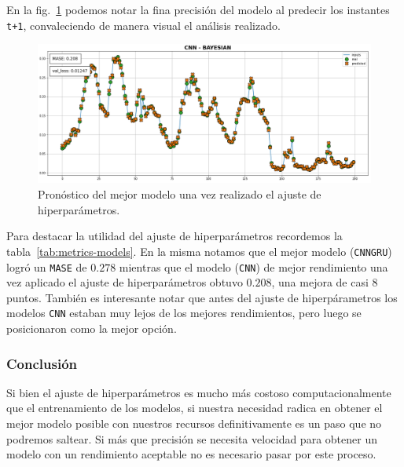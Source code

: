 \documentclass[a4paper,12pt]{article}
\begin{document}
En la fig.~\ref{fig:best_model_hp} podemos notar la fina precisión del modelo al predecir los instantes \texttt{t+1}, convaleciendo de manera visual el análisis realizado.

\begin{figure}[H]
	\begin{center}
	\includegraphics[width=1\textwidth]{cnn_bo_best.png}
  	\caption{Pronóstico del mejor modelo una vez realizado el ajuste de hiperparámetros.}
  	\label{fig:best_model_hp}
  	\end{center}
\end{figure}

Para destacar la utilidad del ajuste de hiperparámetros recordemos la tabla~\ref{tab:metrics-models}. En la misma notamos que el mejor modelo (\texttt{CNNGRU}) logró un \texttt{MASE} de $0.278$ mientras que el modelo (\texttt{CNN}) de mejor rendimiento una vez aplicado el ajuste de hiperparámetros obtuvo $0.208$, una mejora de casi 8 puntos. También es interesante notar que antes del ajuste de hiperpárametros los modelos \texttt{CNN} estaban muy lejos de los mejores rendimientos, pero luego se posicionaron como la mejor opción.

\subsubsection{Conclusión}
Si bien el ajuste de hiperparámetros es mucho más costoso computacionalmente que el entrenamiento de los modelos, si nuestra necesidad radica en obtener el mejor modelo posible con nuestros recursos definitivamente es un paso que no podremos saltear. Si más que precisión se necesita velocidad para obtener un modelo con un rendimiento aceptable no es necesario pasar por este proceso.

\clearpage

{}

%
%
\end{document}

